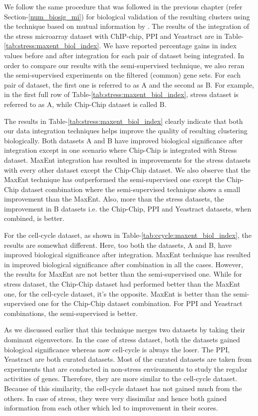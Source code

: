 We follow the same procedure that was followed in the previous chapter (refer Section-\ref{num_biosig_mi}) for biological validation of the resulting clusters using the technique based on 
mutual information by \citet{Gibons2002Judging}. The results of the integration of the stress microarray dataset with ChIP-chip, PPI and Yeastract are in 
Table-\ref{tab:stress:maxent_biol_index}. We have reported percentage gains in index values before and after integration for each pair of dataset being integrated. In order to compare our 
results with the semi-supervised technique, we also reran the semi-supervised experiments on the filtered (common) gene sets. For each pair of dataset, the first one is referred 
to as A and the second as B. For example, in the first full row of Table-\ref{tab:stress:maxent_biol_index}, stress dataset is referred to as A, while Chip-Chip dataset is called B. 

The results in Table-\ref{tab:stress:maxent_biol_index} clearly indicate that both our data integration techniques helps improve the quality of resulting clustering biologically. 
Both datasets A and B have improved biological significance after integration except in one scenario where Chip-Chip is integrated with Stress dataset. MaxEnt 
integration has resulted in improvements for the stress datasets with every other dataset except the Chip-Chip dataset. We also observe that the MaxEnt technique has outperformed 
the semi-supervised one except the Chip-Chip dataset combination where the semi-supervised technique shows a small improvement than the MaxEnt. 
Also, more than the stress datasets, the improvement in B datasets i.e. the Chip-Chip, PPI and Yeastract datasets, when combined, is better. 

For the cell-cycle dataset, as shown in Table-\ref{tab:ccycle:maxent_biol_index}, the results are somewhat different. Here, too both the datasets, A and B, have improved biological 
significance after integration. MaxEnt technique has resulted in improved biological significance
after combination in all the cases. However, the results for MaxEnt are not better than the semi-supervised one. While for stress dataset, the Chip-Chip dataset had performed 
better than the MaxEnt one, for the cell-cycle dataset, it's the opposite. MaxEnt is better than the semi-supervised one for the Chip-Chip dataset combination. 
For PPI and Yeastract combinations, the semi-supervised is better.
 
As we discussed earlier that this technique merges two datasets by taking their dominant eigenvectors. In the case of stress dataset, both the datasets gained biological significance whereas now cell-cycle is always the loser. The PPI, Yeastract 
are both curated datasets. Most of the curated datasets are taken from experiments that are conducted in non-stress environments to study the regular activities of genes. 
Therefore, they are more similar to the cell-cycle dataset. Because of this similarity, the cell-cycle dataset has not gained much from the others. 
In case of stress, they were very dissimilar and hence both gained information from each other which led to improvement in their scores.    

